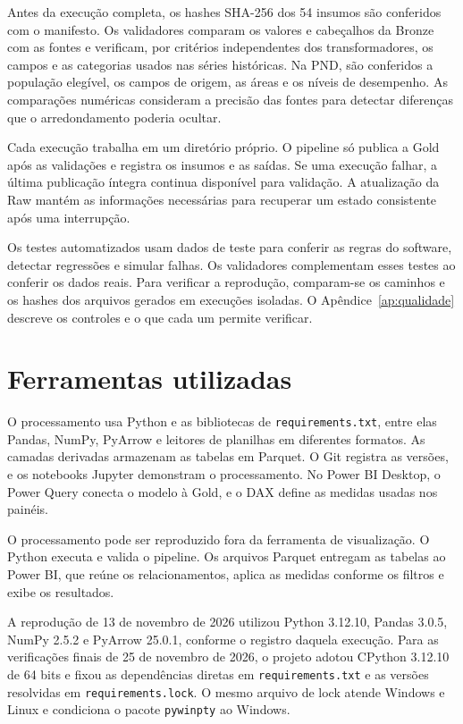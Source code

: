 Antes da execução completa, os hashes SHA-256 dos 54 insumos são conferidos com o manifesto. Os validadores comparam os valores e cabeçalhos da Bronze com as fontes e verificam, por critérios independentes dos transformadores, os campos e as categorias usados nas séries históricas. Na PND, são conferidos a população elegível, os campos de origem, as áreas e os níveis de desempenho. As comparações numéricas consideram a precisão das fontes para detectar diferenças que o arredondamento poderia ocultar.

Cada execução trabalha em um diretório próprio. O pipeline só publica a Gold após as validações e registra os insumos e as saídas. Se uma execução falhar, a última publicação íntegra continua disponível para validação. A atualização da Raw mantém as informações necessárias para recuperar um estado consistente após uma interrupção.

Os testes automatizados usam dados de teste para conferir as regras do software, detectar regressões e simular falhas. Os validadores complementam esses testes ao conferir os dados reais. Para verificar a reprodução, comparam-se os caminhos e os hashes dos arquivos gerados em execuções isoladas. O Apêndice~\ref{ap:qualidade} descreve os controles e o que cada um permite verificar.

\section{Ferramentas utilizadas}

O processamento usa Python e as bibliotecas de \texttt{requirements.txt}, entre elas Pandas, NumPy, PyArrow e leitores de planilhas em diferentes formatos. As camadas derivadas armazenam as tabelas em Parquet. O Git registra as versões, e os notebooks Jupyter demonstram o processamento. No Power BI Desktop, o Power Query conecta o modelo à Gold, e o DAX define as medidas usadas nos painéis.

O processamento pode ser reproduzido fora da ferramenta de visualização. O Python executa e valida o pipeline. Os arquivos Parquet entregam as tabelas ao Power BI, que reúne os relacionamentos, aplica as medidas conforme os filtros e exibe os resultados.

A reprodução de 13 de novembro de 2026 utilizou Python 3.12.10, Pandas 3.0.5, NumPy 2.5.2 e PyArrow 25.0.1, conforme o registro daquela execução. Para as verificações finais de 25 de novembro de 2026, o projeto adotou CPython 3.12.10 de 64 bits e fixou as dependências diretas em \texttt{requirements.txt} e as versões resolvidas em \texttt{requirements.lock}. O mesmo arquivo de lock atende Windows e Linux e condiciona o pacote \texttt{pywinpty} ao Windows.

